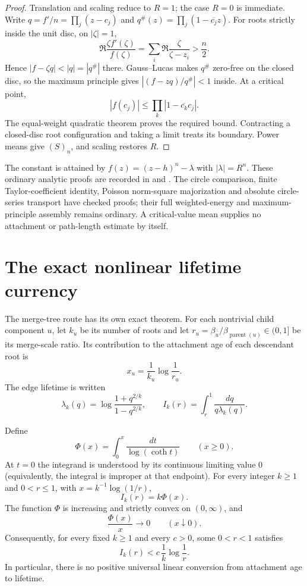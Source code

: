 \documentclass[11pt]{article}
\begin{document}
\begin{proof}
Translation and scaling reduce to $R=1$; the case $R=0$ is immediate.
Write $q=f'/n=\prod_j(z-c_j)$ and
$q^\#(z)=\prod_j(1-\overline{c_j}z)$.
For roots strictly inside the unit disc, on $|\zeta|=1$,
\[
 \Re\frac{\zeta f'(\zeta)}{f(\zeta)}
 =\sum_i\Re\frac{\zeta}{\zeta-z_i}>\frac n2.
\]
Hence $|f-\zeta q|<|q|=|q^\#|$ there.  Gauss--Lucas makes $q^\#$ zero-free
on the closed disc, so the maximum principle gives
$|(f-zq)/q^\#|<1$ inside.  At a critical point,
\[
 |f(c_j)|\le\prod_k|1-\overline{c_k}c_j|.
\]
The equal-weight quadratic theorem proves the required bound.
Contracting a closed-disc root configuration and taking a limit treats its
boundary.  Power means give $(S)_n$, and scaling restores $R$.
\end{proof}

The constant is attained by $f(z)=(z-h)^n-\lambda$ with $|\lambda|=R^n$.
These ordinary analytic proofs are recorded in
 and
.
The circle comparison, finite Taylor-coefficient identity, Poisson norm-square
majorization and absolute circle-series transport have checked proofs; their
full weighted-energy and maximum-principle assembly remains ordinary.
A critical-value mean supplies no attachment or path-length estimate by itself.

\section{The exact nonlinear lifetime currency}
\label{sec:orlicz}

The merge-tree route has its own exact theorem.  For each nontrivial child
component $u$, let $k_u$ be its number of roots and let
$r_u=\beta_u/\beta_{\operatorname{parent}(u)}\in(0,1]$ be its merge-scale
ratio.  Its contribution to the attachment age of each descendant root is
\[
 x_u=\frac1{k_u}\log\frac1{r_u}.
\]
The edge lifetime is written
\[
 \lambda_k(q)=\log\frac{1+q^{2/k}}{1-q^{2/k}},
 \qquad
 I_k(r)=\int_r^1\frac{dq}{q\lambda_k(q)}.
\]

\begin{theorem}
\label{res:orlicz-currency}
Define
\[
 \Phi(x)=\int_0^x\frac{dt}{\log(\coth t)}\qquad(x\ge0).
\]
At $t=0$ the integrand is understood by its continuous limiting value $0$
(equivalently, the integral is improper at that endpoint).
For every integer $k\ge1$ and $0<r\le1$, with
$x=k^{-1}\log(1/r)$,
\[
 I_k(r)=k\Phi(x).                                      \tag{O1}
\]
The function $\Phi$ is increasing and strictly convex on $(0,\infty)$, and
\[
 \frac{\Phi(x)}x\longrightarrow0\qquad(x\downarrow0). \tag{O2}
\]
Consequently, for every fixed $k\ge1$ and every $c>0$, some $0<r<1$
satisfies
\[
 I_k(r)<c\,\frac1k\log\frac1r.                        \tag{O3}
\]
In particular, there is no positive universal linear conversion from
attachment age to lifetime.
\end{theorem}
\end{document}
